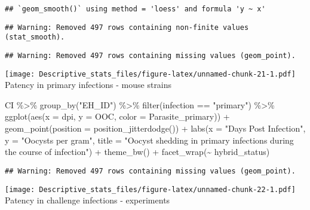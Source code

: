 \documentclass[
]{article}
\newenvironment{Shaded}{\begin{snugshade}}{\end{snugshade}}
\newcommand{\AttributeTok}[1]{\textcolor[rgb]{0.77,0.63,0.00}{#1}}
\newcommand{\FunctionTok}[1]{\textcolor[rgb]{0.00,0.00,0.00}{#1}}
\newcommand{\NormalTok}[1]{#1}
\newcommand{\SpecialCharTok}[1]{\textcolor[rgb]{0.00,0.00,0.00}{#1}}
\newcommand{\StringTok}[1]{\textcolor[rgb]{0.31,0.60,0.02}{#1}}
\begin{document}
\begin{verbatim}
## `geom_smooth()` using method = 'loess' and formula 'y ~ x'
\end{verbatim}

\begin{verbatim}
## Warning: Removed 497 rows containing non-finite values (stat_smooth).
\end{verbatim}

\begin{verbatim}
## Warning: Removed 497 rows containing missing values (geom_point).
\end{verbatim}

\texttt{[image: Descriptive\_stats\_files/figure-latex/unnamed-chunk-21-1.pdf]}
Patency in primary infections - mouse strains

\begin{Shaded}
\begin{Highlighting}[]
\NormalTok{CI }\SpecialCharTok{\%\textgreater{}\%}
  \FunctionTok{group\_by}\NormalTok{(}\StringTok{"EH\_ID"}\NormalTok{) }\SpecialCharTok{\%\textgreater{}\%}
  \FunctionTok{filter}\NormalTok{(infection }\SpecialCharTok{==} \StringTok{"primary"}\NormalTok{) }\SpecialCharTok{\%\textgreater{}\%}
  \FunctionTok{ggplot}\NormalTok{(}\FunctionTok{aes}\NormalTok{(}\AttributeTok{x =}\NormalTok{ dpi, }\AttributeTok{y =}\NormalTok{ OOC, }\AttributeTok{color =}\NormalTok{ Parasite\_primary)) }\SpecialCharTok{+}
  \FunctionTok{geom\_point}\NormalTok{(}\AttributeTok{position =} \FunctionTok{position\_jitterdodge}\NormalTok{()) }\SpecialCharTok{+}
  \FunctionTok{labs}\NormalTok{(}\AttributeTok{x =} \StringTok{"Days Post Infection"}\NormalTok{, }\AttributeTok{y =} \StringTok{"Oocysts per gram"}\NormalTok{,}
       \AttributeTok{title =} \StringTok{"Oocyst shedding in primary infections during the }
\StringTok{       course of infection"}\NormalTok{) }\SpecialCharTok{+}
    \FunctionTok{theme\_bw}\NormalTok{() }\SpecialCharTok{+}
    \FunctionTok{facet\_wrap}\NormalTok{(}\SpecialCharTok{\textasciitilde{}}\NormalTok{ hybrid\_status)}
\end{Highlighting}
\end{Shaded}

\begin{verbatim}
## Warning: Removed 497 rows containing missing values (geom_point).
\end{verbatim}

\texttt{[image: Descriptive\_stats\_files/figure-latex/unnamed-chunk-22-1.pdf]}
Patency in challenge infections - experiments
\end{document}
